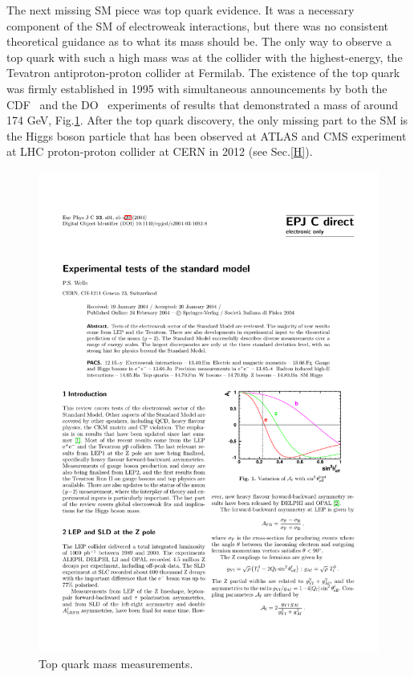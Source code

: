 The next missing SM piece was top quark evidence. It was a necessary component of the SM of electroweak interactions, but there was no consistent theoretical guidance as to what its mass should be. The only way to observe a top quark with such a high mass was at the collider with the highest-energy, the Tevatron antiproton-proton collider at Fermilab. The existence of the top quark was firmly established in 1995 with simultaneous announcements by both the CDF~\cite{PhysRevLett.73.225} and the DO~\cite{D0:1995jca} experiments of results that demonstrated a mass of around 174 GeV, Fig.\ref{Wells2004_Article_ExperimentalTestsOfTheStandard}.
After the top quark discovery, the only missing part to the SM is the Higgs boson particle  that has been observed at ATLAS and CMS experiment at LHC proton-proton collider at CERN in 2012 (see Sec.\ref{H}).  
\begin{figure}
\centering
\includegraphics[scale= 0.66]{../Cap1/Wells2004_Article_ExperimentalTestsOfTheStandard}
\caption{Top quark mass measurements.}
\label{Wells2004_Article_ExperimentalTestsOfTheStandard}
\end{figure}


